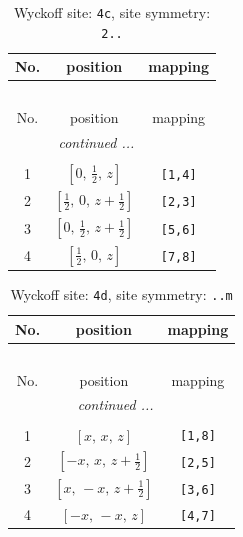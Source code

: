 \documentclass[fleqn,8pt]{jsarticle}
\begin{document}
\renewcommand{\arraystretch}{1.2}
\begin{longtable}{ccc}
\caption{Wyckoff site: {\tt 4c}, site symmetry: {\tt 2..}}
 \\
 \hline \hline
No. & position & mapping \\ \hline \endfirsthead

\multicolumn{2}{l}{\tablename\ \thetable{}} \\
 \hline \hline
No. & position & mapping \\ \hline \endhead

 \hline \hline
\multicolumn{2}{r}{\footnotesize\it continued ...} \\ \endfoot

 \hline \hline
\multicolumn{2}{r}{} \\ \endlastfoot

1 & $\left[ 0,\, \frac{1}{2},\, z \right]$ & {\tt [1,4]} \\ \hline
2 & $\left[ \frac{1}{2},\, 0,\, z + \frac{1}{2} \right]$ & {\tt [2,3]} \\ \hline
3 & $\left[ 0,\, \frac{1}{2},\, z + \frac{1}{2} \right]$ & {\tt [5,6]} \\ \hline
4 & $\left[ \frac{1}{2},\, 0,\, z \right]$ & {\tt [7,8]} \\
\end{longtable}
\renewcommand{\arraystretch}{1.2}
\begin{longtable}{ccc}
\caption{Wyckoff site: {\tt 4d}, site symmetry: {\tt ..m}}
 \\
 \hline \hline
No. & position & mapping \\ \hline \endfirsthead

\multicolumn{2}{l}{\tablename\ \thetable{}} \\
 \hline \hline
No. & position & mapping \\ \hline \endhead

 \hline \hline
\multicolumn{2}{r}{\footnotesize\it continued ...} \\ \endfoot

 \hline \hline
\multicolumn{2}{r}{} \\ \endlastfoot

1 & $\left[ x,\, x,\, z \right]$ & {\tt [1,8]} \\ \hline
2 & $\left[ - x,\, x,\, z + \frac{1}{2} \right]$ & {\tt [2,5]} \\ \hline
3 & $\left[ x,\, - x,\, z + \frac{1}{2} \right]$ & {\tt [3,6]} \\ \hline
4 & $\left[ - x,\, - x,\, z \right]$ & {\tt [4,7]} \\
\end{longtable}
\end{document}
